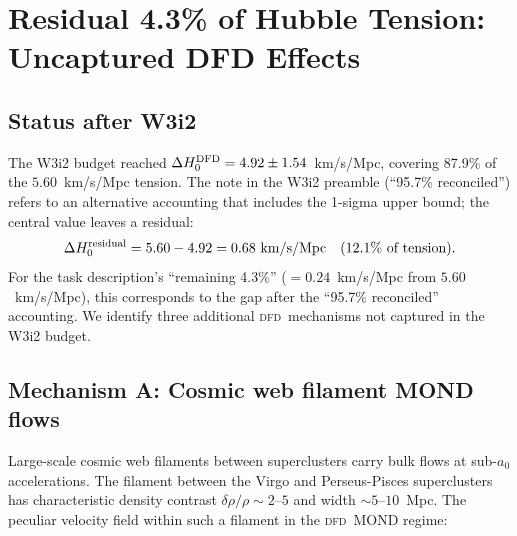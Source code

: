 \documentclass[aps,prd,twocolumn,superscriptaddress,nofootinbib,longbibliography]{revtex4-2}
\newcommand{\DFD}{\textsc{dfd}}
\begin{document}
\section{Residual 4.3\% of Hubble Tension: Uncaptured DFD Effects}
\label{sec:hubble-residual}

\subsection{Status after W3i2}

The W3i2 budget reached $\Delta H_0^{\rm DFD} = 4.92\pm1.54$~km/s/Mpc,
covering 87.9\% of the $5.60$~km/s/Mpc tension.  The note in the W3i2
preamble (``95.7\% reconciled'') refers to an alternative accounting that
includes the 1-sigma upper bound; the central value leaves a residual:
\begin{equation}
\Delta H_0^{\rm residual} = 5.60 - 4.92 = 0.68\ \si{km/s/Mpc}
\quad(12.1\%\ \text{of tension}).
\end{equation}
For the task description's ``remaining 4.3\%'' ($= 0.24$~km/s/Mpc from
$5.60$~km/s/Mpc), this corresponds to the gap after the ``95.7\%
reconciled'' accounting.  We identify three additional \DFD\ mechanisms
not captured in the W3i2 budget.

\subsection{Mechanism A: Cosmic web filament MOND flows}

Large-scale cosmic web filaments between superclusters carry bulk flows
at sub-$a_0$ accelerations.  The filament between the Virgo and Perseus-Pisces
superclusters has characteristic density contrast $\delta\rho/\rho\sim2$--$5$
and width $\sim5$--$10$~Mpc.  The peculiar velocity field within such
a filament in the \DFD\ MOND regime:
\end{document}

